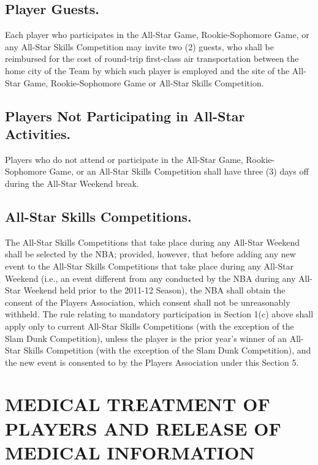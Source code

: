 \documentclass[
]{book}
\begin{document}
\hypertarget{player-guests.}{%
\section{Player Guests.}\label{player-guests.}}

Each player who participates in the All-Star Game, Rookie-Sophomore Game, or any All-Star Skills Competition may invite two (2) guests, who shall be reimbursed for the cost of round-trip first-class air transportation between the home city of the Team by which such player is employed and the site of the All-Star Game, Rookie-Sophomore Game or All-Star Skills Competition.

\hypertarget{players-not-participating-in-all-star-activities.}{%
\section{Players Not Participating in All-Star Activities.}\label{players-not-participating-in-all-star-activities.}}

Players who do not attend or participate in the All-Star Game, Rookie- Sophomore Game, or an All-Star Skills Competition shall have three (3) days off during the All-Star Weekend break.

\hypertarget{all-star-skills-competitions.}{%
\section{All-Star Skills Competitions.}\label{all-star-skills-competitions.}}

The All-Star Skills Competitions that take place during any All-Star Weekend shall be selected by the NBA; provided, however, that before adding any new event to the All-Star Skills Competitions that take place during any All-Star Weekend (i.e., an event different from any conducted by the NBA during any All-Star Weekend held prior to the 2011-12 Season), the NBA shall obtain the consent of the Players Association, which consent shall not be unreasonably withheld. The rule relating to mandatory participation in Section 1(c) above shall apply only to current All-Star Skills Competitions (with the exception of the Slam Dunk Competition), unless the player is the prior year's winner of an All-Star Skills Competition (with the exception of the Slam Dunk Competition), and the new event is consented to by the Players Association under this Section 5.

\hypertarget{medical-treatment-of-players-and-release-of-medical-information}{%
\chapter{MEDICAL TREATMENT OF PLAYERS AND RELEASE OF MEDICAL INFORMATION}\label{medical-treatment-of-players-and-release-of-medical-information}}
\end{document}
